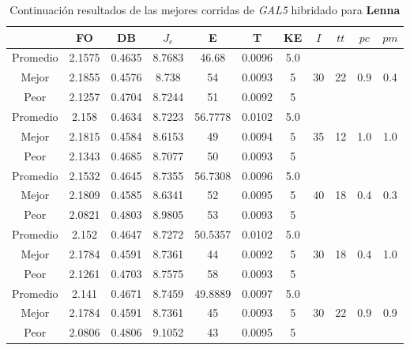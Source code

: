 \begin{table}[h!]
    \footnotesize
    \begin{center}
        \begin{tabular}{|c|c|c|c|c|c|c|c|c|c|c|}
        \hline
             & {\bf FO} & {\bf DB} & $J_e$ & {\bf E} & {\bf T} & {\bf KE} & $I$ & $tt$ & $pc$ & $pm$ \\
        \hline
        \hline
            Promedio  & 2.1575 & 0.4635 & 8.7683 & 46.68 & 0.0096 & 5.0 &  &  &  & \\
            \cline{1-7}
            Mejor & 2.1855 & 0.4576  & 8.738 & 54 & 0.0093 & 5 & 30 & 22 & 0.9 & 0.4\\
            \cline{1-7}
            Peor & 2.1257 & 0.4704  & 8.7244 & 51 & 0.0092 & 5 &  &  &  & \\
        \hline
        \hline
            Promedio  & 2.158 & 0.4634 & 8.7223 & 56.7778 & 0.0102 & 5.0 &  &  &  & \\
            \cline{1-7}
            Mejor & 2.1815 & 0.4584  & 8.6153 & 49 & 0.0094 & 5 & 35 & 12 & 1.0 & 1.0\\
            \cline{1-7}
            Peor & 2.1343 & 0.4685  & 8.7077 & 50 & 0.0093 & 5 &  &  &  & \\
        \hline
        \hline
            Promedio  & 2.1532 & 0.4645 & 8.7355 & 56.7308 & 0.0096 & 5.0 &  &  &  & \\
            \cline{1-7}
            Mejor & 2.1809 & 0.4585  & 8.6341 & 52 & 0.0095 & 5 & 40 & 18 & 0.4 & 0.3\\
            \cline{1-7}
            Peor & 2.0821 & 0.4803  & 8.9805 & 53 & 0.0093 & 5 &  &  &  & \\
        \hline
        \hline
            Promedio  & 2.152 & 0.4647 & 8.7272 & 50.5357 & 0.0102 & 5.0 &  &  &  & \\
            \cline{1-7}
            Mejor & 2.1784 & 0.4591  & 8.7361 & 44 & 0.0092 & 5 & 30 & 18 & 0.4 & 1.0\\
            \cline{1-7}
            Peor & 2.1261 & 0.4703  & 8.7575 & 58 & 0.0093 & 5 &  &  &  & \\
        \hline
        \hline
            Promedio  & 2.141 & 0.4671 & 8.7459 & 49.8889 & 0.0097 & 5.0 &  &  &  & \\
            \cline{1-7}
            Mejor & 2.1784 & 0.4591  & 8.7361 & 45 & 0.0093 & 5 & 30 & 22 & 0.9 & 0.9\\
            \cline{1-7}
            Peor & 2.0806 & 0.4806  & 9.1052 & 43 & 0.0095 & 5 &  &  &  & \\
        \hline
        \end{tabular}
        \caption{Continuaci\'on resultados de las mejores corridas de \emph{GAL5} hibridado para {\bf Lenna}}
        \label{tb:tablecGAL5}
    \end{center}
\end{table}
